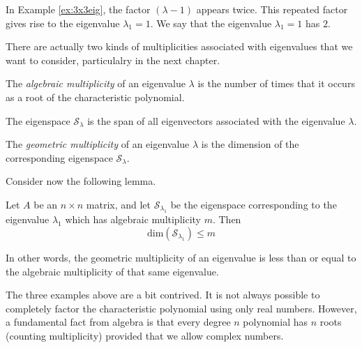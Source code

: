 \documentclass{ximera}
\begin{document}
In Example \ref{ex:3x3eig}, the factor  $(\lambda-1)$ appears twice.  This repeated factor gives rise to the eigenvalue $\lambda_1=1$.  We say that the eigenvalue $\lambda_1=1$ has  $2$.

There are actually two kinds of multiplicities associated with eigenvalues that we want to consider, particulalry in the next chapter. 

\begin{definition}\label{def:geommulteig}

The \emph{algebraic multiplicity} of an eigenvalue $\lambda$ is the number of times that it occurs as a root of the characteristic polynomial.

The eigenspace $\mathcal{S}_\lambda$ is the span of all eigenvectors associated with the eigenvalue $\lambda$.

The \emph{geometric multiplicity} of an eigenvalue $\lambda$ is the dimension of the corresponding eigenspace $\mathcal{S}_\lambda$. 
\end{definition}

Consider now the following lemma.

\begin{lemma}\label{lemma:dimeigenspace}
Let $A$ be an $n\times n$ matrix, and let $\mathcal{S}_{\lambda_1}$ be the eigenspace corresponding to the eigenvalue $\lambda_1$ which has algebraic multiplicity $m$.  Then
$$\mbox{dim}(\mathcal{S}_{\lambda_1})\leq m$$
\end{lemma}

In other words, the geometric multiplicity of an eigenvalue is less than or equal to the algebraic multiplicity of that same eigenvalue.

    
The three examples above are a bit contrived.  It is not always possible to completely factor the characteristic polynomial using only real numbers.  However, a fundamental fact from algebra is that every degree $n$ polynomial has $n$ roots (counting multiplicity) provided that we allow complex numbers.
    
\end{document}
